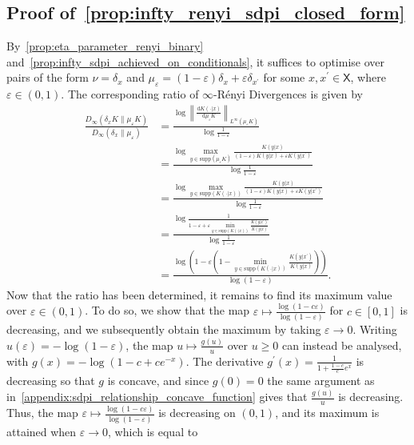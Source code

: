 \documentclass[conference,letterpaper]{IEEEtran}
\def \X{\mathsf X}
\def \supp {\mathrm{supp}}
\newcommand{\dd}[1]{\mathrm{d}#1}
\begin{document}
\subsection{Proof of~\cref{prop:infty_renyi_sdpi_closed_form}}\label{appendix:proof_infty_renyi_sdpi_closed_form}\noindent
    By~\cref{prop:eta_parameter_renyi_binary} and~\cref{prop:infty_sdpi_achieved_on_conditionals}, it suffices to optimise over pairs of the form $\nu = \delta_x$ and $\mu_\varepsilon = (1-\varepsilon)\delta_x + \varepsilon\delta_{x^\prime}$ for some $x, x^\prime\in\X$, where $\varepsilon\in(0,1)$. The corresponding ratio of $\infty$-R\'enyi Divergences is given by
    \begin{align*}
        \frac{D_\infty(\delta_x K\|\mu_\varepsilon K)}{D_\infty(\delta_x\|\mu_\varepsilon)} &= \frac{\log \left\|\frac{\dd K(\cdot|x)}{\dd\mu_\varepsilon K}\right\|_{L^\infty(\mu_\varepsilon K)}}{\log\frac1{1-\varepsilon}}\\
        &= \frac{\log \max_{y\in\supp(\mu_\varepsilon K)}\frac{K(y|x)}{(1-\varepsilon)K(y|x) +\varepsilon K(y|x^\prime)}}{\log\frac1{1-\varepsilon}}\\
        &= \frac{\log \max_{y\in\supp(K(\cdot|x))}\frac{K(y|x)}{(1-\varepsilon)K(y|x) +\varepsilon K(y|x^\prime)}}{\log\frac1{1-\varepsilon}}\\
        &= \frac{\log \frac1{1-\varepsilon + \varepsilon \min_{y\in\supp(K(\cdot|x))}\frac{K(y|x^\prime)}{K(y|x)}}}{\log\frac1{1-\varepsilon}}\\
        &= \frac{\log \left(1-\varepsilon \left(1 -\min_{y\in\supp(K(\cdot|x))}\frac{K(y|x^\prime)}{K(y|x)}\right)\right)}{\log(1-\varepsilon)}.
    \end{align*}
    Now that the ratio has been determined, it remains to find its maximum value over $\varepsilon\in(0,1)$. To do so, we show that the map $\varepsilon \mapsto \frac{\log(1-c\varepsilon)}{\log(1-\varepsilon)}$ for $c\in[0,1]$ is decreasing, and we subsequently obtain the maximum by taking $\varepsilon\to 0$. Writing $u(\varepsilon) = -\log(1-\varepsilon)$, the map $u\mapsto \frac{g(u)}{u}$ over $u\geq 0$ can instead be analysed, with $g(x) = -\log(1 -c+ce^{-x})$. The derivative $g^\prime(x) = \frac1{1+\frac{1-c}{c}e^{x}}$ is decreasing so that $g$ is concave, and since $g(0)=0$ the same argument as in~\cref{appendix:sdpi_relationship_concave_function} gives that $\frac{g(u)}{u}$ is decreasing. Thus, the map $\varepsilon \mapsto \frac{\log(1-c\varepsilon)}{\log(1-\varepsilon)}$ is decreasing on $(0,1)$, and its maximum is attained when $\varepsilon\to 0$, which is equal to
\end{document}
